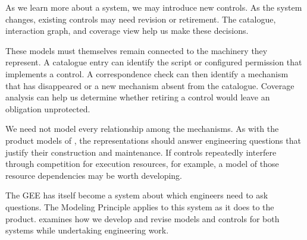 
As we learn more about a system, we may introduce new controls. As the system changes, existing controls may need revision or retirement. The catalogue, interaction graph, and coverage view help us make these decisions.


These models must themselves remain connected to the machinery they represent. A catalogue entry can identify the script or configured permission that implements a control. A correspondence check can then identify a mechanism that has disappeared or a new mechanism absent from the catalogue. Coverage analysis can help us determine whether retiring a control would leave an obligation unprotected.


We need not model every relationship among the mechanisms. As with the product models of , the representations should answer engineering questions that justify their construction and maintenance. If controls repeatedly interfere through competition for execution resources, for example, a model of those resource dependencies may be worth developing.

The GEE has itself become a system about which engineers need to ask questions. The Modeling Principle applies to this system as it does to the product.  examines how we develop and revise models and controls for both systems while undertaking engineering work.
